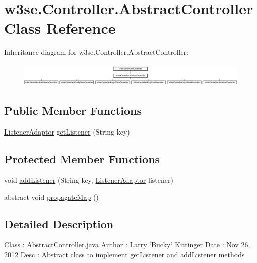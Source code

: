 \hypertarget{classw3se_1_1_controller_1_1_abstract_controller}{\section{w3se.\-Controller.\-Abstract\-Controller Class Reference}
\label{classw3se_1_1_controller_1_1_abstract_controller}
}
Inheritance diagram for w3se.\-Controller.\-Abstract\-Controller\-:\begin{figure}[H]
\begin{center}
\leavevmode
\includegraphics[height=1.176471cm]{classw3se_1_1_controller_1_1_abstract_controller}
\end{center}
\end{figure}
\subsection*{Public Member Functions}
\begin{DoxyCompactItemize}
\item 
\hyperlink{classw3se_1_1_controller_1_1_listener_adaptor}{Listener\-Adaptor} \hyperlink{classw3se_1_1_controller_1_1_abstract_controller_ae7209447a304e2134c9ec1c2c249cd98}{get\-Listener} (String key)
\end{DoxyCompactItemize}
\subsection*{Protected Member Functions}
\begin{DoxyCompactItemize}
\item 
void \hyperlink{classw3se_1_1_controller_1_1_abstract_controller_a07a8d0a513d3650a075f73a43186de9f}{add\-Listener} (String key, \hyperlink{classw3se_1_1_controller_1_1_listener_adaptor}{Listener\-Adaptor} listener)
\item 
abstract void \hyperlink{classw3se_1_1_controller_1_1_abstract_controller_a92ee594be5083c2db0eb40286190595e}{propagate\-Map} ()
\end{DoxyCompactItemize}


\subsection{Detailed Description}
Class \-: Abstract\-Controller.\-java Author \-: Larry \char`\"{}\-Bucky\char`\"{} Kittinger Date \-: Nov 26, 2012 Desc \-: Abstract class to implement get\-Listener and add\-Listener methods 

